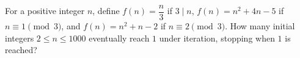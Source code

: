 For a positive integer $n$, define $f(n)=\dfrac{n}{3}$ if $3\mid n$, $f(n)=n^2+4n-5$ if $n\equiv1\pmod3$, and $f(n)=n^2+n-2$ if $n\equiv2\pmod3$. How many initial integers $2\le n\le1000$ eventually reach $1$ under iteration, stopping when $1$ is reached?
